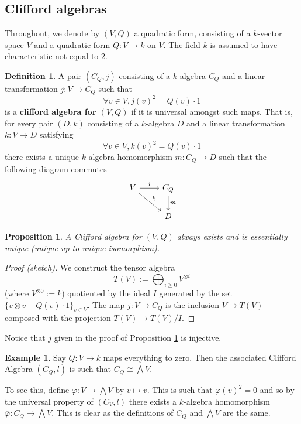 \documentclass[12pt]{article}
\theoremstyle{plain}
\newtheorem{proposition}[thm]{Proposition}
\theoremstyle{definition}
\newtheorem{defn}[thm]{Definition} %
\newtheorem{example}[thm]{Example}
\newcommand{\lto}{\longrightarrow}
\begin{document}
	\subsection{Clifford algebras}
	Throughout, we denote by $(V,Q)$ a quadratic form, consisting of a $k$-vector space $V$ and a quadratic form $Q: V \lto k$ on $V$. The field $k$ is assumed to have characteristic not equal to 2.
	\begin{defn}
		A pair $(C_Q,j)$ consisting of a $k$-algebra $C_Q$ and a linear transformation $j: V \lto C_Q$ such that
		\begin{equation}
			\forall v \in V, j(v)^2 = Q(v)\cdot 1
		\end{equation}
		is a \textbf{clifford algebra for $(V,Q)$} if it is universal amongst such maps. That is, for every pair $(D,k)$ consisting of a $k$-algebra $D$ and a linear transformation $k: V \lto D$ satisfying
		\begin{equation}
			\forall v \in V, k(v)^2 = Q(v)\cdot 1
		\end{equation}
		there exists a unique $k$-algebra homomorphism $m: C_Q \lto D$ such that the following diagram commutes
		\begin{equation}
			\begin{tikzcd}
				V\arrow[r,"j"]\arrow[rd,"k"] & C_Q\arrow[d,"m"]\\
				& D
			\end{tikzcd}
		\end{equation}
	\end{defn}
	\begin{proposition}\label{prop:clifford_construction}
		A Clifford algebra for $(V,Q)$ always exists and is essentially unique (unique up to unique isomorphism).
	\end{proposition}
	\begin{proof}[Proof (sketch)]
		We construct the tensor algebra
		\begin{equation}
			T(V) := \bigoplus_{i \geq 0}V^{\otimes i}
		\end{equation}
		(where $V^{\otimes 0} := k$) quotiented by the ideal $I$ generated by the set $\lbrace v \otimes v - Q(v)\cdot 1\rbrace_{v \in V}$. The map $j: V \lto C_Q$ is the inclusion $V \lto T(V)$ composed with the projection $T(V) \lto T(V)/I$.
	\end{proof}
	Notice that $j$ given in the proof of Proposition \ref{prop:clifford_construction} is injective.
	\begin{example}\label{ex:clifford_exterior}
		Say $Q: V \lto k$ maps everything to zero. Then the associated Clifford Algebra $(C_Q,l)$ is such that $C_Q \cong \bigwedge V$.
		
		To see this, define $\varphi: V \lto \bigwedge V$ by $v \mapsto v$. This is such that $\varphi(v)^2 = 0$ and so by the universal property of $(C_V,l)$ there exists a $k$-algebra homomorphism $\overline{\varphi}: C_Q \lto \bigwedge V$. This is clear as the definitions of $C_Q$ and $\bigwedge V$ are the same.
	\end{example}
\end{document}
